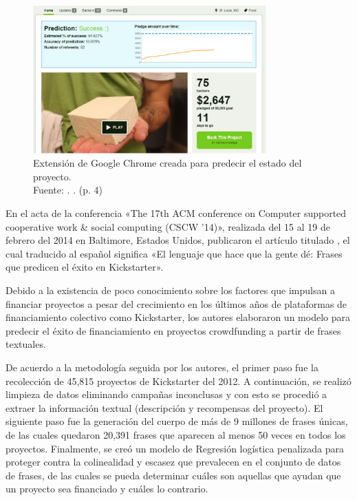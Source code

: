 \begin{figure}[!ht]
	\begin{center}
		\includegraphics[width=0.80\textwidth]{2/figures/chen2013.jpg}
		\caption[Extensión de Google Chrome creada para predecir el estado del proyecto]{Extensión de Google Chrome creada para predecir el estado del proyecto.\\
			Fuente: \cite{pr_chen2013kickpredict}. . (p. 4)}
		\label{2:fig111}
	\end{center}
\end{figure}

En el acta de la conferencia «The 17th ACM conference on Computer supported cooperative work \& social computing (CSCW '14)», realizada del 15 al 19 de febrero del 2014 en Baltimore, Estados Unidos, \cite{pr_mitra2014phrases} publicaron el artículo titulado , el cual traducido al español significa «El lenguaje que hace que la gente dé: Frases que predicen el éxito en Kickstarter».

Debido a la existencia de poco conocimiento sobre los factores que impulsan a financiar proyectos a pesar del crecimiento en los últimos años de plataformas de financiamiento colectivo como Kickstarter, los autores elaboraron un modelo para predecir el éxito de financiamiento en proyectos crowdfunding a partir de frases textuales.

De acuerdo a la metodología seguida por los autores, el primer paso fue la recolección de 45,815 proyectos de Kickstarter del 2012. A continuación, se realizó limpieza de datos eliminando campañas inconclusas y con esto se procedió a extraer la información textual (descripción y recompensas del proyecto). El siguiente paso fue la generación del cuerpo de más de 9 millones de frases únicas, de las cuales quedaron 20,391 frases que aparecen al menos 50 veces en todos los proyectos. Finalmente, se creó un modelo de Regresión logística penalizada para proteger contra la colinealidad y escasez que prevalecen en el conjunto de datos de frases, de las cuales se pueda determinar cuáles son aquellas que ayudan que un proyecto sea financiado y cuáles lo contrario.

